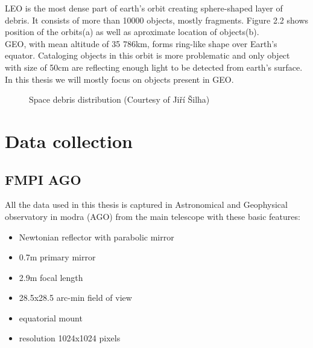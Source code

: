 \documentclass[12pt, a4paper, oneside]{book}
\begin{document}
LEO is the most dense part of earth's orbit creating sphere-shaped layer of debris.
It consists of more than 10000 objects, mostly fragments.
Figure 2.2 shows position of the orbits(a) as well as aproximate location of objects(b).
\\
GEO, with mean altitude of 35 786km, forms ring-like shape over Earth's equator.
Cataloging objects in this orbit is more problematic and only object with size of 50cm are reflecting enough light to be detected from earth's surface.
In this thesis we will mostly focus on objects present in GEO.
\\

\begin{figure}[h]
    \centering
    \qquad
    \caption{Space debris distribution (Courtesy of Jiří Šilha)}%
    \label{fig:example}%
\end{figure}

\section{Data collection}

\subsection{FMPI AGO}
All the data used in this thesis is captured in Astronomical and Geophysical observatory in modra (AGO) from the main telescope with these basic features:
\begin{itemize}
    \item{Newtonian reflector with parabolic mirror}
    \item{0.7m primary mirror}
    \item{2.9m focal length}
    \item{28.5x28.5 arc-min field of view}
    \item{equatorial mount}
    \item{resolution 1024x1024 pixels}
\end{itemize}
\end{document}

